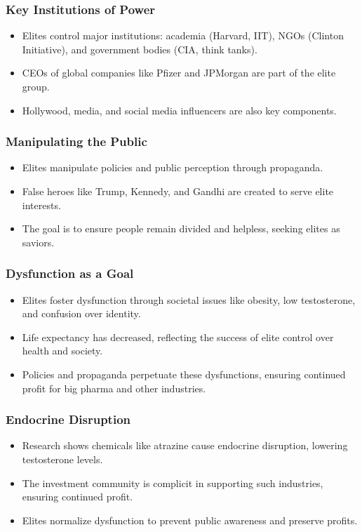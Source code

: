 \begin{frame}[fragile]\frametitle{Key Institutions of Power}
    \begin{itemize}
        \item Elites control major institutions: academia (Harvard, IIT), NGOs (Clinton Initiative), and government bodies (CIA, think tanks).
        \item CEOs of global companies like Pfizer and JPMorgan are part of the elite group.
        \item Hollywood, media, and social media influencers are also key components.
    \end{itemize}
\end{frame}

\begin{frame}[fragile]\frametitle{Manipulating the Public}
    \begin{itemize}
        \item Elites manipulate policies and public perception through propaganda.
        \item False heroes like Trump, Kennedy, and Gandhi are created to serve elite interests.
        \item The goal is to ensure people remain divided and helpless, seeking elites as saviors.
    \end{itemize}
\end{frame}

\begin{frame}[fragile]\frametitle{Dysfunction as a Goal}
    \begin{itemize}
        \item Elites foster dysfunction through societal issues like obesity, low testosterone, and confusion over identity.
        \item Life expectancy has decreased, reflecting the success of elite control over health and society.
        \item Policies and propaganda perpetuate these dysfunctions, ensuring continued profit for big pharma and other industries.
    \end{itemize}
\end{frame}

\begin{frame}[fragile]\frametitle{Endocrine Disruption}
    \begin{itemize}
        \item Research shows chemicals like atrazine cause endocrine disruption, lowering testosterone levels.
        \item The investment community is complicit in supporting such industries, ensuring continued profit.
        \item Elites normalize dysfunction to prevent public awareness and preserve profits.
    \end{itemize}
\end{frame}

